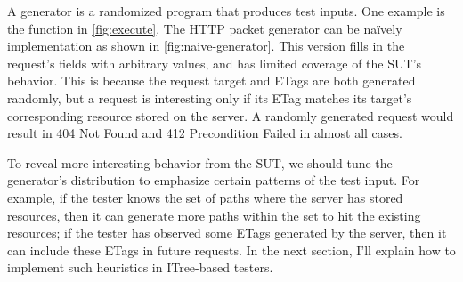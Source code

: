 A generator is a randomized program that produces test inputs.  One example is
the  function in \autoref{fig:execute}.  The HTTP packet
generator can be na\"ively implementation as shown in
\autoref{fig:naive-generator}.  This version fills in the request's fields with
arbitrary values, and has limited coverage of the SUT's behavior.  This is
because the request target and ETags are both generated randomly, but a request
is interesting only if its ETag matches its target's corresponding resource
stored on the server.  A randomly generated request would result in 404 Not
Found and 412 Precondition Failed in almost all cases.

To reveal more interesting behavior from the SUT, we should tune the generator's
distribution to emphasize certain patterns of the test input.  For example, if
the tester knows the set of paths where the server has stored resources, then it
can generate more paths within the set to hit the existing resources; if the
tester has observed some ETags generated by the server, then it can include
these ETags in future requests.  In the next section, I'll explain how to
implement such heuristics in ITree-based testers.

